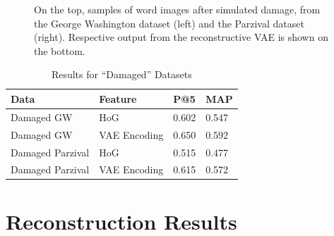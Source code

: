 \documentclass[final]{ukthesis}
\begin{document}
\begin{figure}[t]
\begin{center}
\end{center}
\caption{On the top, samples of word images after simulated damage, from the George Washington dataset (left) and the Parzival dataset (right). Respective output from the reconstructive VAE is shown on the bottom.}
\label{fig:damaged-word-samples}
\end{figure}

\begin{table}[h]
\centering
\begin{tabular}{llll}
\textbf{Data}  & \textbf{Feature} & \textbf{P@5} & \textbf{MAP} \\
\hline
Damaged GW    & HoG			& 0.602          & 0.547          \\
Damaged GW    & VAE Encoding 	& 0.650          & 0.592          \\
Damaged Parzival & HoG                     & 0.515          & 0.477          \\
Damaged Parzival & VAE Encoding 	& 0.615          & 0.572          \\   
\end{tabular}
\caption{Results for ``Damaged'' Datasets}
\label{tab:damaged-results}
\end{table}




%
%
\section{Reconstruction Results}
\label{sec:reconstruction-results}
\end{document}
